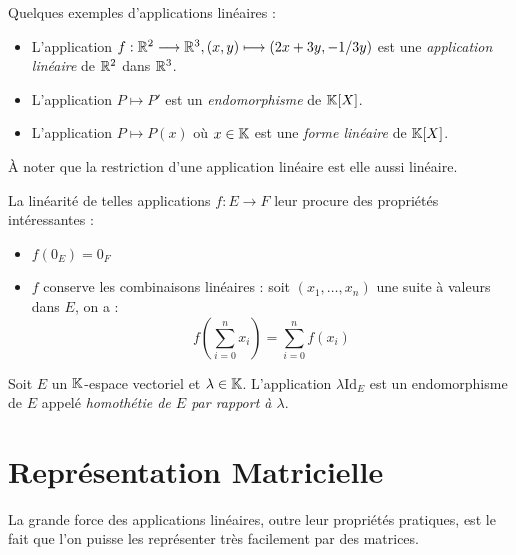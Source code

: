 \begin{example}
    Quelques exemples d'applications linéaires :
    \begin{itemize}
        \item L'application $f : \mathbb{R}^2 \longrightarrow \mathbb{R}^3, (x,y) \longmapsto (2x + 3y, -1/3y)$ est une \emph{application 
        linéaire} de $\mathbb{R}^2$ dans $\mathbb{R}^3$. 
        \item L'application $P \longmapsto P'$ est un \emph{endomorphisme} de $\mathbb{K}[X]$. 
        \item L'application $P \longmapsto P(x)$ où $x \in \mathbb{K}$ est une \emph{forme linéaire} de $\mathbb{K}[X]$. 
    \end{itemize}
\end{example}

\begin{remark}
    À noter que la restriction d'une application linéaire est elle aussi linéaire. 
\end{remark}

\begin{prop}
    La linéarité de telles applications $f : E \longrightarrow F$ leur procure des propriétés intéressantes : 
    \begin{itemize}
        \item $ f(0_E) = 0_F $ 
        \item $f$ conserve les combinaisons linéaires : soit $(x_1, \dots, x_n)$ une suite à valeurs dans $E$, on a :
            \[ f \left( \sum_{i=0}^{n} x_i \right) = \sum_{i=0}^{n} f(x_i) \] 
    \end{itemize}
\end{prop}

\begin{definition}[Homothétie]
    Soit $E$ un $\mathbb{K}$-espace vectoriel et $\lambda \in \mathbb{K}$. 
    L'application $ \lambda \text{Id}_E$ est un endomorphisme de $E$ appelé \emph{homothétie de $E$ par rapport à $\lambda$}. 
\end{definition}



\section{Représentation Matricielle}

La grande force des applications linéaires, outre leur propriétés pratiques, est le fait que l'on puisse 
les représenter très facilement par des matrices. 

